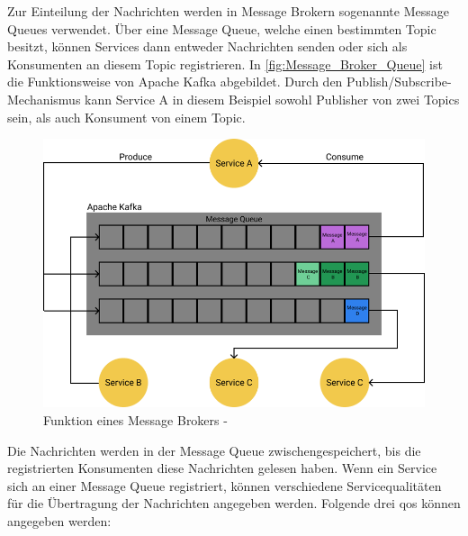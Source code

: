 Zur Einteilung der Nachrichten werden in Message Brokern sogenannte Message Queues verwendet. Über eine Message Queue, welche einen bestimmten Topic besitzt, können Services dann entweder Nachrichten senden oder sich als Konsumenten an diesem Topic registrieren. In \autoref{fig:Message_Broker_Queue} ist die Funktionsweise von Apache Kafka abgebildet. Durch den Publish/Subscribe-Mechanismus kann Service A in diesem Beispiel sowohl Publisher von zwei Topics sein, als auch Konsument von einem Topic.

\begin{figure}[H]
    \centering
    \includegraphics[width=0.65\linewidth]{images/apache-kafka.png}
    \caption{Funktion eines Message Brokers - \cite{MichaelSchwab.2019}}
    \label{fig:Message_Broker_Queue}
\end{figure}

Die Nachrichten werden in der Message Queue zwischengespeichert, bis die registrierten Konsumenten diese Nachrichten gelesen haben. Wenn ein Service sich an einer Message Queue registriert, können verschiedene Servicequalitäten für die Übertragung der Nachrichten angegeben werden. Folgende drei \glqq \gls{qos}\grqq{} können angegeben werden: \cite{ApacheSoftwareFoundation.2021}


